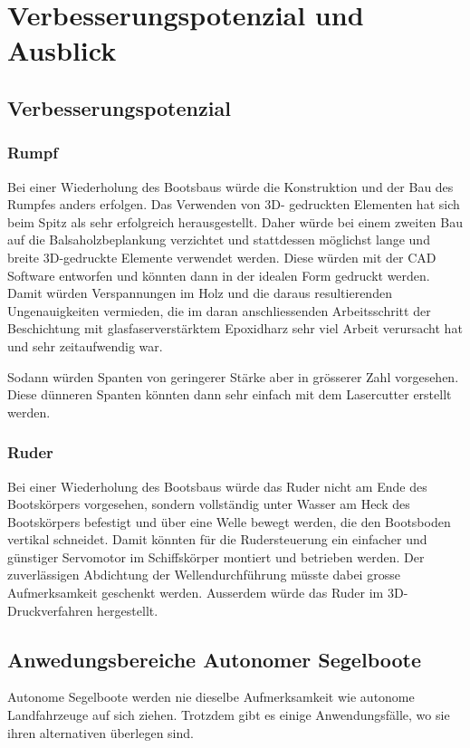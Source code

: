 \chapter{Verbesserungspotenzial und Ausblick}
\label{chap:fazit}


\section{Verbesserungspotenzial}
\subsection{Rumpf}
Bei einer Wiederholung des Bootsbaus würde die Konstruktion und der Bau des Rumpfes anders erfolgen. Das Verwenden von 3D- gedruckten Elementen hat sich beim Spitz als sehr erfolgreich herausgestellt. Daher würde bei einem zweiten Bau auf die Balsaholzbeplankung verzichtet und stattdessen möglichst lange und breite 3D-gedruckte Elemente verwendet werden. Diese würden mit der CAD Software entworfen und könnten dann in der idealen Form gedruckt werden. Damit würden Verspannungen im Holz und die daraus resultierenden Ungenauigkeiten vermieden, die im daran anschliessenden Arbeitsschritt der Beschichtung mit glasfaserverstärktem Epoxidharz sehr viel Arbeit verursacht hat und sehr zeitaufwendig war.

Sodann würden Spanten von geringerer Stärke aber in grösserer Zahl vorgesehen. Diese dünneren Spanten könnten dann sehr einfach mit dem Lasercutter erstellt werden.


\subsection{Ruder}
Bei einer Wiederholung des Bootsbaus würde das Ruder nicht am Ende des Bootskörpers vorgesehen, sondern vollständig unter Wasser am Heck des Bootskörpers befestigt und über eine Welle bewegt werden, die den Bootsboden vertikal schneidet. Damit könnten für die Rudersteuerung ein einfacher und günstiger Servomotor im Schiffskörper montiert und betrieben werden. Der zuverlässigen Abdichtung der Wellendurchführung müsste dabei grosse Aufmerksamkeit geschenkt werden. Ausserdem würde das Ruder im 3D-Druckverfahren hergestellt. 
\section{Anwedungsbereiche Autonomer Segelboote}

Autonome Segelboote werden nie dieselbe Aufmerksamkeit wie autonome Landfahrzeuge auf sich ziehen. Trotzdem gibt es einige Anwendungsfälle, wo sie ihren alternativen überlegen sind.

